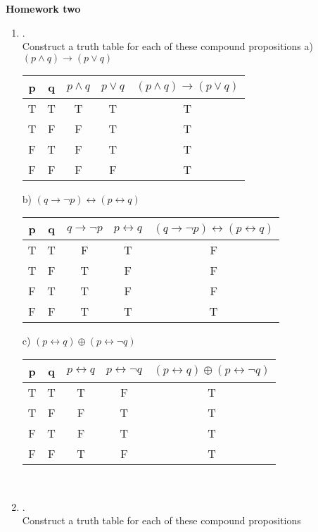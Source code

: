 \documentclass{article}
\theoremstyle{definition}
\theoremstyle{plain}
\begin{document}
\begin{center} \bf \LARGE Homework two\\
\end{center}


\begin {enumerate}[itemindent=30pt,label=\bf Exercise {\arabic*}:]

\item .\\
Construct a truth table for each of these compound propositions
\subitem a) $(p \land q) \to (p \lor q)$

\subitem
\begin{tabular}{| c | c | c | c | c |}
    \hline
	p & q & $p \land q$ & $ p \lor q$ & $(p \land q) \to (p \lor q)$ \\
	\hline
	T & T & T & T & T\\
	\hline
	T & F & F & T & T\\
	\hline
	F & T & F & T & T\\
	\hline
	F & F & F & F & T \\
	\hline
\end{tabular}
\subitem b) $(q \to \neg p) \leftrightarrow (p \leftrightarrow q)$
\subitem
\begin{tabular}{| c | c | c | c | c |}
	\hline
	p & q & $q \to \neg p$ & $p \leftrightarrow q$ &$(q \to \neg p) \leftrightarrow (p \leftrightarrow q)$\\
	\hline
	T & T & F & T & F\\
	\hline
	T & F & T & F & F\\
	\hline 
	F & T & T & F & F\\
	\hline
	F & F & T & T & T\\
	\hline
\end{tabular}
\subitem c) $(p \leftrightarrow q) \oplus (p \leftrightarrow \neg q) $
\subitem
\begin{tabular}{| c | c | c | c | c |}
	\hline
	p & q & $p \leftrightarrow q$ & $p \leftrightarrow \neg q$ & $(p \leftrightarrow q) \oplus (p \leftrightarrow \neg q) $\\
	\hline
	T & T & T & F & T \\
	\hline
	T & F & F & T & T \\
	\hline 
	F & T & F & T & T \\
	\hline 
	F & F & T & F & T \\
	\hline
\end{tabular}
\\
\item .
\\ Construct a truth table for each of these compound propositions

\end{enumerate}
\end{document}
